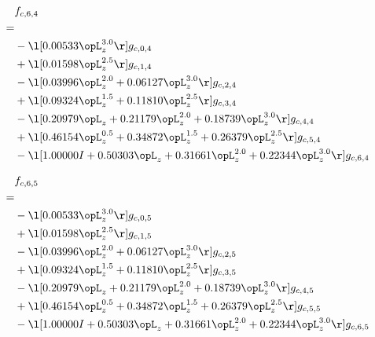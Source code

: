 \begin{alignat}{2} 
\label{eq:f_64_0} 
& f_{c,6,4} \nonumber \\ 
 = \\ 
& - \l[  0.00533 \opL_z^{3.0}  \r] g_{c,0,4} \nonumber \\ 
& + \l[  0.01598 \opL_z^{2.5}  \r] g_{c,1,4} \nonumber \\ 
& - \l[  0.03996 \opL_z^{2.0} +  0.06127 \opL_z^{3.0}  \r] g_{c,2,4} \nonumber \\ 
& + \l[  0.09324 \opL_z^{1.5} +  0.11810 \opL_z^{2.5}  \r] g_{c,3,4} \nonumber \\ 
& - \l[  0.20979 \opL_z +  0.21179 \opL_z^{2.0} +  0.18739 \opL_z^{3.0}  \r] g_{c,4,4} \nonumber \\ 
& + \l[  0.46154 \opL_z^{0.5} +  0.34872 \opL_z^{1.5} +  0.26379 \opL_z^{2.5}  \r] g_{c,5,4} \nonumber \\ 
& - \l[  1.00000 I +  0.50303 \opL_z +  0.31661 \opL_z^{2.0} +  0.22344 \opL_z^{3.0}  \r] g_{c,6,4} \nonumber \\ 
\end{alignat} 


\begin{alignat}{2} 
\label{eq:f_65_0} 
& f_{c,6,5} \nonumber \\ 
 = \\ 
& - \l[  0.00533 \opL_z^{3.0}  \r] g_{c,0,5} \nonumber \\ 
& + \l[  0.01598 \opL_z^{2.5}  \r] g_{c,1,5} \nonumber \\ 
& - \l[  0.03996 \opL_z^{2.0} +  0.06127 \opL_z^{3.0}  \r] g_{c,2,5} \nonumber \\ 
& + \l[  0.09324 \opL_z^{1.5} +  0.11810 \opL_z^{2.5}  \r] g_{c,3,5} \nonumber \\ 
& - \l[  0.20979 \opL_z +  0.21179 \opL_z^{2.0} +  0.18739 \opL_z^{3.0}  \r] g_{c,4,5} \nonumber \\ 
& + \l[  0.46154 \opL_z^{0.5} +  0.34872 \opL_z^{1.5} +  0.26379 \opL_z^{2.5}  \r] g_{c,5,5} \nonumber \\ 
& - \l[  1.00000 I +  0.50303 \opL_z +  0.31661 \opL_z^{2.0} +  0.22344 \opL_z^{3.0}  \r] g_{c,6,5} \nonumber \\ 
\end{alignat} 


